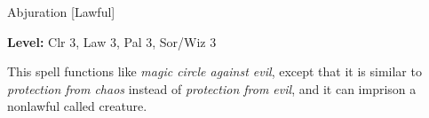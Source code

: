 
Abjuration [Lawful]

\textbf{Level:} Clr 3, Law 3, Pal 3, Sor/Wiz 3

This spell functions like \textit{magic circle against evil}, except that it is 
similar to \textit{protection from chaos} instead of \textit{protection from evil}, 
and it can imprison a nonlawful called creature.

